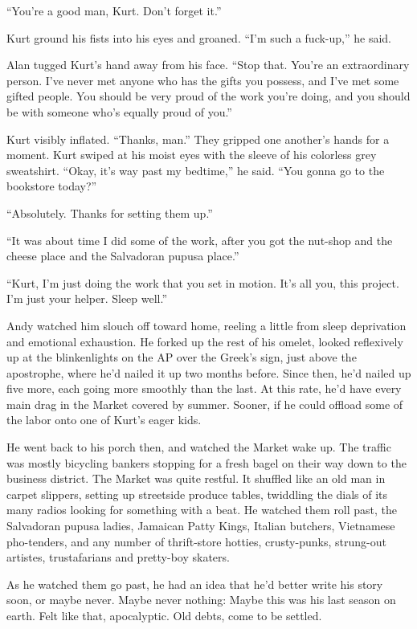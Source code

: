 \documentclass{article}
\begin{document}
``You're a good man, Kurt.  Don't forget it.''

Kurt ground his fists into his eyes and groaned.  ``I'm such a
fuck-up,'' he said.

Alan tugged Kurt's hand away from his face.  ``Stop that.  You're an
extraordinary person.  I've never met anyone who has the gifts you
possess, and I've met some gifted people.  You should be very proud of
the work you're doing, and you should be with someone who's equally
proud of you.''

Kurt visibly inflated.  ``Thanks, man.'' They gripped one another's
hands for a moment.  Kurt swiped at his moist eyes with the sleeve of
his colorless grey sweatshirt.  ``Okay, it's way past my bedtime,'' he
said.  ``You gonna go to the bookstore today?''

``Absolutely.  Thanks for setting them up.''

``It was about time I did some of the work, after you got the nut-shop
and the cheese place and the Salvadoran pupusa place.''

``Kurt, I'm just doing the work that you set in motion.  It's all you,
this project.  I'm just your helper.  Sleep well.''

Andy watched him slouch off toward home, reeling a little from sleep
deprivation and emotional exhaustion.  He forked up the rest of his
omelet, looked reflexively up at the blinkenlights on the AP over the
Greek's sign, just above the apostrophe, where he'd nailed it up two
months before.  Since then, he'd nailed up five more, each going more
smoothly than the last.  At this rate, he'd have every main drag in
the Market covered by summer.  Sooner, if he could offload some of the
labor onto one of Kurt's eager kids.

He went back to his porch then, and watched the Market wake up.  The
traffic was mostly bicycling bankers stopping for a fresh bagel on
their way down to the business district.  The Market was quite
restful.  It shuffled like an old man in carpet slippers, setting up
streetside produce tables, twiddling the dials of its many radios
looking for something with a beat.  He watched them roll past, the
Salvadoran pupusa ladies, Jamaican Patty Kings, Italian butchers,
Vietnamese pho-tenders, and any number of thrift-store hotties,
crusty-punks, strung-out artistes, trustafarians and pretty-boy
skaters.

As he watched them go past, he had an idea that he'd better write his
story soon, or maybe never.  Maybe never nothing:  Maybe this was his
last season on earth.  Felt like that, apocalyptic.  Old debts, come
to be settled.
\end{document}
